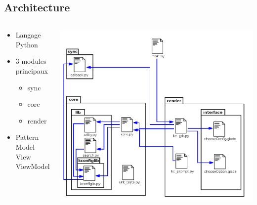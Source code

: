 \documentclass[11pt]{beamer}
\begin{document}
\subsection{Architecture}
\begin{frame}
    \begin{columns}
    	\begin{column}{5cm}
            \begin{itemize}
                \setlength{\itemsep}{20pt}
                \item Langage Python
                \item 3 modules principaux
                    \begin{itemize}
                        \item sync
                        \item core
                        \item render
                    \end{itemize}
                \item Pattern Model View ViewModel
            \end{itemize}
    	\end{column}

    	\begin{column}{6cm}
    		\begin{overprint}
                \includegraphics[scale=0.25]{archi_add_v1.png}
    		\end{overprint}
    	\end{column}
    \end{columns}
\end{frame}
\end{document}
